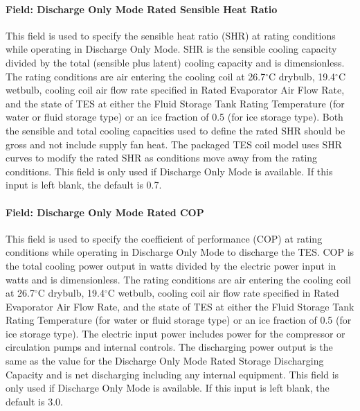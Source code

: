\paragraph{Field: Discharge Only Mode Rated Sensible Heat Ratio}\label{field-discharge-only-mode-rated-sensible-heat-ratio}

This field is used to specify the sensible heat ratio (SHR) at rating conditions while operating in Discharge Only Mode. SHR is the sensible cooling capacity divided by the total (sensible plus latent) cooling capacity and is dimensionless. The rating conditions are air entering the cooling coil at 26.7$^\circ$C drybulb, 19.4$^\circ$C wetbulb, cooling coil air flow rate specified in Rated Evaporator Air Flow Rate, and the state of TES at either the Fluid Storage Tank Rating Temperature (for water or fluid storage type) or an ice fraction of 0.5 (for ice storage type). Both the sensible and total cooling capacities used to define the rated SHR should be gross and not include supply fan heat. The packaged TES coil model uses SHR curves to modify the rated SHR as conditions move away from the rating conditions. This field is only used if Discharge Only Mode is available. If this input is left blank, the default is 0.7.

\paragraph{Field: Discharge Only Mode Rated COP}\label{field-discharge-only-mode-rated-cop}

This field is used to specify the coefficient of performance (COP) at rating conditions while operating in Discharge Only Mode to discharge the TES. COP is the total cooling power output in watts divided by the electric power input in watts and is dimensionless. The rating conditions are air entering the cooling coil at 26.7$^\circ$C drybulb, 19.4$^\circ$C wetbulb, cooling coil air flow rate specified in Rated Evaporator Air Flow Rate, and the state of TES at either the Fluid Storage Tank Rating Temperature (for water or fluid storage type) or an ice fraction of 0.5 (for ice storage type). The electric input power includes power for the compressor or circulation pumps and internal controls. The discharging power output is the same as the value for the Discharge Only Mode Rated Storage Discharging Capacity and is net discharging including any internal equipment. This field is only used if Discharge Only Mode is available. If this input is left blank, the default is 3.0.

